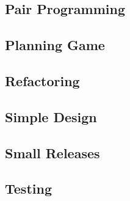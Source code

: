 \subsection{Pair Programming}


\subsection{Planning Game}


\subsection{Refactoring}


\subsection{Simple Design}


\subsection{Small Releases}


\subsection{Testing}

